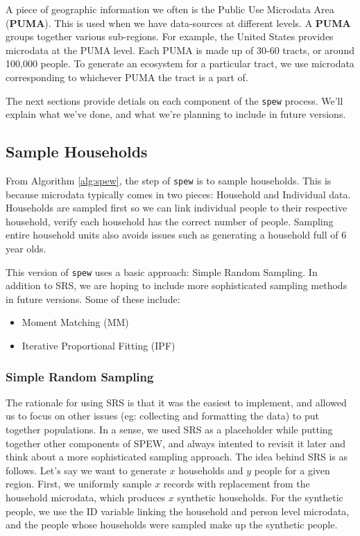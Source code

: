 \documentclass{article}
\begin{document}
	A piece of geographic information we often is the Public Use Microdata Area (\textbf{PUMA}). This is used when we have data-sources at different levels. A \textbf{PUMA} groups together various sub-regions. For example, the United States provides microdata at the PUMA level. Each PUMA is made up of 30-60 tracts, or around 100,000 people. To generate an ecosystem for a particular tract, we use microdata corresponding to whichever PUMA the tract is a part of. 

	The next sections provide detials on each component of the \verb|spew| process. We'll explain what we've done, and what we're planning to include in future versions. 

	\subsection{Sample Households}
		From Algorithm \ref{alg:spew}, the step of \verb|spew| is to sample households. This is because microdata typically comes in two pieces: Household and Individual data. Households are sampled first so we can link individual people to their respective household, verify each household has the correct number of people. Sampling entire household units also avoids issues such as generating a household full of 6 year olds. 

		This version of \verb|spew| uses a basic approach: Simple Random Sampling. In addition to SRS, we are hoping to include more sophisticated sampling methods in future versions. Some of these include:

			\begin{itemize}
				\item Moment Matching (MM)
				\item Iterative Proportional Fitting (IPF)
			\end{itemize}

		\subsubsection{Simple Random Sampling}
		The rationale for using SRS is that it was the easiest to implement, and allowed us to focus on other issues (eg: collecting and formatting the data) to put together populations. In a sense, we used SRS as a placeholder while putting together other components of SPEW, and always intented to revisit it later and think about a more sophisticated sampling approach. The idea behind SRS is as follows. Let's say we want to generate $x$ households and $y$ people for a given region. First, we uniformly sample $x$ records with replacement from the household microdata, which produces $x$ synthetic households. For the synthetic people, we use the ID variable linking the household and person level microdata, and the people whose households were sampled make up the synthetic people.
\end{document}
